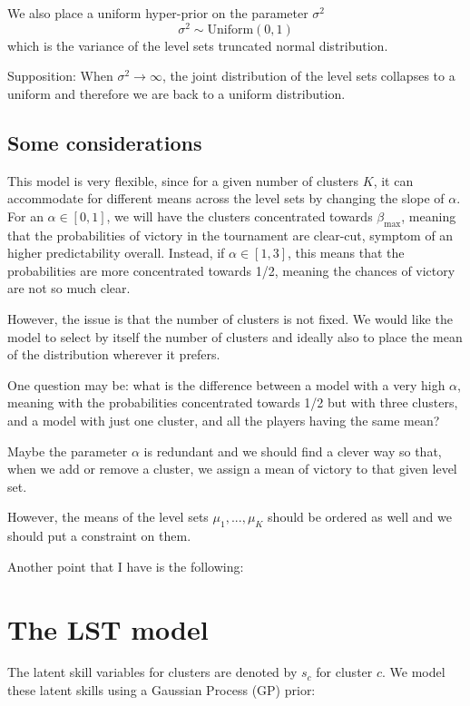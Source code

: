 \documentclass[11pt]{amsart}
\begin{document}
We also place a uniform hyper-prior on the parameter $\sigma^2$
\[
\sigma^2 \sim \text{Uniform}(0, 1)
\]
which is the variance of the level sets truncated normal distribution.

Supposition:
When $\sigma^2 \rightarrow \infty$, the joint distribution of the level sets collapses to a uniform and therefore we are back to a uniform distribution.

\subsection{Some considerations}

This model is very flexible, since for a given number of clusters $K$, it can accommodate for different means across the level sets by changing the slope of $\alpha$. For an $\alpha \in [0,1]$, we will have the clusters concentrated towards $\beta_{\max}$, meaning that the probabilities of victory in the tournament are clear-cut, symptom of an higher predictability overall. Instead, if $\alpha \in [1,3]$, this means that the probabilities are more concentrated towards 1/2, meaning the chances of victory are not so much clear. 

However, the issue is that the number of clusters is not fixed. We would like the model to select by itself the number of clusters and ideally also to place the mean of the distribution wherever it prefers. 

One question may be: what is the difference between a model with a very high $\alpha$, meaning with the probabilities concentrated towards 1/2 but with three clusters, and a model with just one cluster, and all the players having the same mean?

Maybe the parameter $\alpha$ is redundant and we should find a clever way so that, when we add or remove a cluster, we assign a mean of victory to that given level set.

However, the means of the level sets $\mu_1 ,...,\mu_K$ should be ordered as well and we should put a constraint on them.

Another point that I have is the following:


\section{The LST model}



The latent skill variables for clusters are denoted by $s_c$ for cluster $c$. We model these latent skills using a Gaussian Process (GP) prior:
\end{document}
